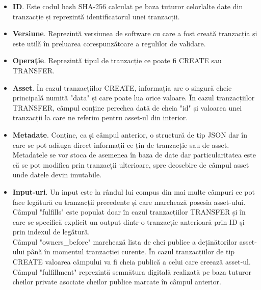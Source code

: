 \begin{itemize}
    \item \textbf{ID}. Este codul hash SHA-256 calculat pe baza tuturor celorlalte date din tranzacție și reprezintă identificatorul unei tranzacții.
    
    \item \textbf{Versiune}. Reprezintă versiunea de software cu care a fost creată tranzacția și este utilă în preluarea corespunzătoare a regulilor de validare.
    
    \item \textbf{Operație}. Reprezintă tipul de tranzacție ce poate fi CREATE sau TRANSFER.
    
    \item \textbf{Asset}. În cazul tranzacțiilor CREATE, informația are o singură cheie principală numită "data" și care poate lua orice valoare. În cazul tranzacțiilor TRANSFER, câmpul conține perechea dată de cheia "id" și valoarea unei tranzacții la care ne referim pentru asset-ul din interior.
    
    \item \textbf{Metadate}. Conține, ca și câmpul anterior, o structură de tip JSON dar în care se pot adăuga direct informații ce țin de tranzacție sau de asset. Metadatele se vor stoca de asemenea în baza de date dar particularitatea este că se pot modifica prin tranzacții ulterioare, spre deosebire de câmpul asset unde datele devin imutabile.
    
    \item \textbf{Input-uri}. 
    Un input este la rândul lui compus din mai multe câmpuri ce pot face legătură cu tranzacții precedente și care marchează posesia asset-ului.\\
    
    Câmpul "fulfills" este populat doar în cazul tranzacțiilor TRANSFER și în care se specifică explicit un output dintr-o tranzacție anterioară prin ID și prin indexul de legătură.\\
    
    Câmpul "owners\_before" marchează lista de chei publice a deținătorilor asset-ului până în momentul tranzacției curente. În cazul tranzacțiilor de tip CREATE valoarea câmpului va fi cheia publică a celui care creează asset-ul.\\
    
    Câmpul "fulfillment" reprezintă semnătura digitală realizată pe baza tuturor cheilor private asociate cheilor publice marcate în câmpul anterior.
    

\end{itemize}
